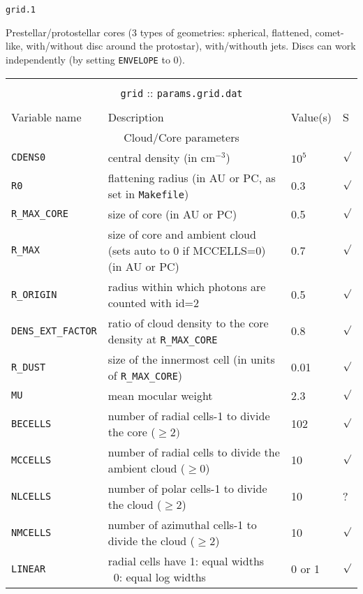 \documentclass[12pt,a4paper]{article}
\begin{document}
\newpage

{\large \texttt{grid.1}}

\vspace{1cm}
\noindent Prestellar/protostellar cores (3 types of geometries: spherical, flattened, comet-like, with/without disc around the protostar), with/withouth jets. Discs can work independently (by setting \texttt{ENVELOPE} to 0).
\vspace{1cm}


{\centering 
\begin{tabular}{|p{4.4cm}|p{10.1cm}|p{2.3cm}|p{0.3cm}|}
\hline
\multicolumn{4}{|c|}{}\\ 
\multicolumn{4}{|c|}{\large \texttt{grid} :: \texttt{params.grid.dat} }\\ 
\multicolumn{4}{|c|}{}\\ 
\hline
Variable name & Description & Value(s) & S \\
\hline
\multicolumn{4}{|c|}{Cloud/Core parameters}\\
\hline
\texttt{CDENS0} & central density (in cm$^{-3}$) & $10^5$ & $\surd$\\
\texttt{R0} & flattening radius (in AU or PC, as set in \texttt{Makefile}) & 0.3 & $\surd$\\
\texttt{R\_MAX\_CORE}& size of core (in AU or PC) & 0.5 & $\surd$\\
\texttt{R\_MAX}& size of core and ambient cloud (sets auto to 0 if MCCELLS=0) (in AU or PC)  & 0.7&$\surd$\\
\texttt{R\_ORIGIN}& radius within which photons are counted with id=2 & 0.5 &$\surd$\\
\texttt{DENS\_EXT\_FACTOR}& ratio of cloud density to the core density at \texttt{R\_MAX\_CORE}& 0.8 & $\surd$\\
\texttt{R\_DUST}& size of the innermost cell (in units of \texttt{R\_MAX\_CORE}) & 0.01 & $\surd$\\
\texttt{MU}& mean mocular weight & 2.3 & $\surd$\\
\texttt{BECELLS}& number of radial cells-1 to divide the core ($\geq2)$& 102 &$\surd$\\
\texttt{MCCELLS}& number of radial cells to divide the ambient cloud ($\geq0$) & 10 & $\surd$\\
\texttt{NLCELLS} & number of polar cells-1 to divide the cloud ($\geq2$)& 10 & ? \\
\texttt{NMCELLS} & number of azimuthal cells-1 to divide the cloud ($\geq2$)& 10 &$\surd$\\
\texttt{LINEAR} & radial cells have 1: equal widths \ 0: equal log widths & 0 or 1 & $\surd$\\

\end{tabular}}
\end{document}
